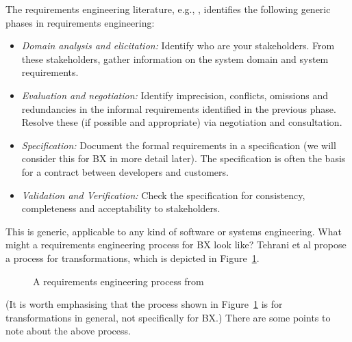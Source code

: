 The requirements engineering literature, e.g., \cite{ieee-29148-2011}, identifies the following generic phases in requirements engineering:
\begin{itemize}
\item \textit{Domain analysis and elicitation:} Identify who are your stakeholders. From these stakeholders, gather information on the system domain and system requirements.

\item \textit{Evaluation and negotiation:} Identify imprecision, conflicts, omissions and redundancies in the informal requirements identified in the previous phase.  Resolve these (if possible and appropriate) via negotiation and consultation.

\item \textit{Specification:} Document the formal requirements in a specification (we will consider this for BX in more detail later). The specification is often the basis for a contract between developers and customers.

\item \textit{Validation and Verification:} Check the specification for consistency, completeness and acceptability to stakeholders.
\end{itemize}

This is generic, applicable to any kind of software or systems engineering. What might a requirements engineering process for BX look like? Tehrani et al \cite{TehraniZL16} propose a process for transformations, which is depicted in Figure~\ref{fig:re-process}.

\begin{figure}[htbp]
\caption{A requirements engineering process from \cite{TehraniZL16}}
\label{fig:re-process}
\end{figure}
(It is worth emphasising that the process shown in Figure~\ref{fig:re-process} is for transformations in general, not specifically for BX.) There are some points to note about the above process.

